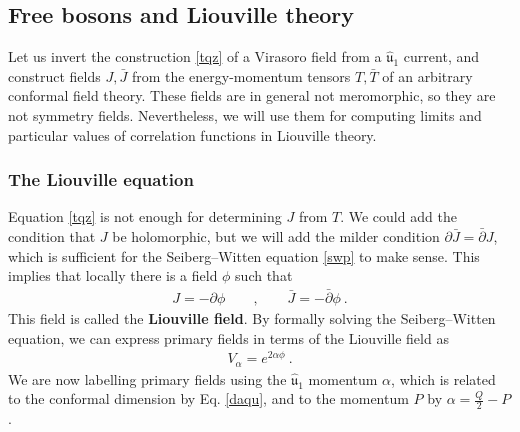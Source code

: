 \documentclass[12pt, a4paper, notitlepage, twoside]{report}
\numberwithin{equation}{section}
\theoremstyle{break}
\begin{document}
\subsection{Free bosons and Liouville theory \label{seclld}}

Let us invert the 
construction \eqref{tqz} of a Virasoro field from a $\hat{\mathfrak{u}}_1$ current, and construct fields $J,\bar J$ from the energy-momentum tensors $T,\bar T$ of an arbitrary conformal field theory. 
These fields are in general not meromorphic, so they are not symmetry fields.
Nevertheless, we will use them for computing limits and particular values of correlation functions in Liouville theory.

\subsubsection{The Liouville equation}

Equation \eqref{tqz} is not enough for determining $J$ from $T$. We could add the condition that $J$ be holomorphic, but we will add the milder condition $\partial \bar J = \bar\partial J$, 
which is sufficient for the Seiberg--Witten equation \eqref{swp} to make sense. This implies that locally there is a field $\phi$ such that 
\begin{align}
 J = -\partial \phi \qquad , \qquad \bar J = -\bar\partial \phi \ .
\end{align}
This field is called the \textbf{Liouville field}. By formally solving the Seiberg--Witten equation, we can express primary fields in terms of the Liouville field as 
\begin{align}
 V_\alpha = e^{2\alpha \phi} \ .
\end{align}
We are now labelling primary fields using the $\hat{\mathfrak{u}}_1$ momentum $\alpha$, which is related to the conformal dimension by Eq. \eqref{daqu}, and to the momentum $P$ by $\alpha =\frac{Q}{2}-P$.
\end{document}
